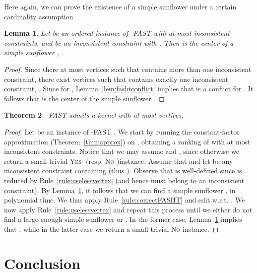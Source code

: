 \documentclass[11pt]{article}
\newtheorem{theorem}{Theorem}[section]
\newtheorem{lemma}[theorem]{Lemma}
\begin{document}
Here again, we can prove the existence of a simple sunflower under a certain cardinality assumption. 

\begin{lemma}
	\label{lem:correctrFAST}
	Let  be an ordered instance of {\sc -FAST}  with at most  inconsistent constraints, and  be an inconsistent constraint with . Then  is the center of a simple sunflower , .
\end{lemma}

\begin{proof}
Since there at most  vertices  such that  contains more than one inconsistent constraint, there exist  vertices  such that  contains exactly one inconsistent constraint, . Since  for , Lemma~\ref{lem:fashtconflict} implies that  is a conflict for . It follows that  is the center of the simple sunflower .
 \end{proof}

\begin{theorem}
\label{thm:fasht}
	{\sc -FAST} admits a kernel with at most  vertices.
\end{theorem}

\begin{proof}
	Let  be an instance of {\sc -FAST} . We start by running the constant-factor approximation (Theorem~\ref{thm:approx}) on , obtaining a ranking  of  with at most  inconsistent constraints. Notice that we may assume  and , since otherwise we return a small trivial \textsc{Yes}- (resp. \textsc{No}-)instance. Assume that  and let  be any inconsistent constraint containing  (thus ). Observe that  is well-defined since  is reduced by Rule~\ref{rule:uselessvertex} (and hence  must belong to an inconsistent constraint). 
	By Lemma~\ref{lem:correctrFAST}, it follows that we can find a simple sunflower ,  in polynomial time. We thus apply Rule~\ref{rule:correctFASHT} and edit  w.r.t. . We now apply Rule~\ref{rule:uselessvertex} and repeat this process until we either do not find a large enough simple sunflower or . In the former case, Lemma~\ref{lem:correctrFAST} implies that , while in the latter case we return a small trivial \textsc{No}-instance.  
 \end{proof}

\section{Conclusion}
\end{document}
